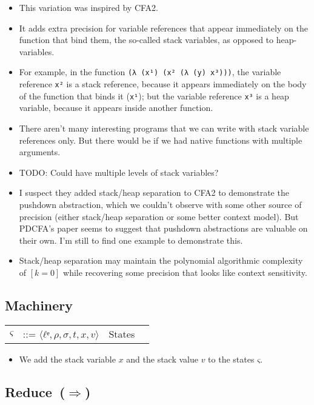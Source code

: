 \documentclass[12pt, oneside]{book}
\begin{document}
\begin{itemize}
  \item This variation was inspired by CFA2.
  \item It adds extra precision for variable references that appear immediately on the function that bind them, the so-called stack variables, as opposed to heap-variables.
  \item For example, in the function \texttt{(λ (x¹) (x² (λ (y) x³)))}, the variable reference \texttt{x²} is a stack reference, because it appears immediately on the body of the function that binds it (\texttt{x¹}); but the variable reference \texttt{x³} is a heap variable, because it appears inside another function.
  \item There aren’t many interesting programs that we can write with stack variable references only. But there would be if we had native functions with multiple arguments.
  \item TODO: Could have multiple levels of stack variables?
  \item I suspect they added stack/heap separation to CFA2 to demonstrate the pushdown abstraction, which we couldn’t observe with some other source of precision (either stack/heap separation or some better context model). But PDCFA’s paper seems to suggest that pushdown abstractions are valuable on their own. I’m still to find one example to demonstrate this.
  \item Stack/heap separation may maintain the polynomial algorithmic complexity of \([k=0]\) while recovering some precision that looks like context sensitivity.
\end{itemize}

\subsection{Machinery}

\begin{tabular}{rcll}
  \(ς\) & ::= \(⟨ℓᵉ, ρ, σ, t, x, v⟩\) & States \\
\end{tabular}

\begin{itemize}
  \item We add the stack variable \(x\) and the stack value \(v\) to the states \(ς\).
\end{itemize}

\subsection{Reduce~(\(⇒\))}
\end{document}
